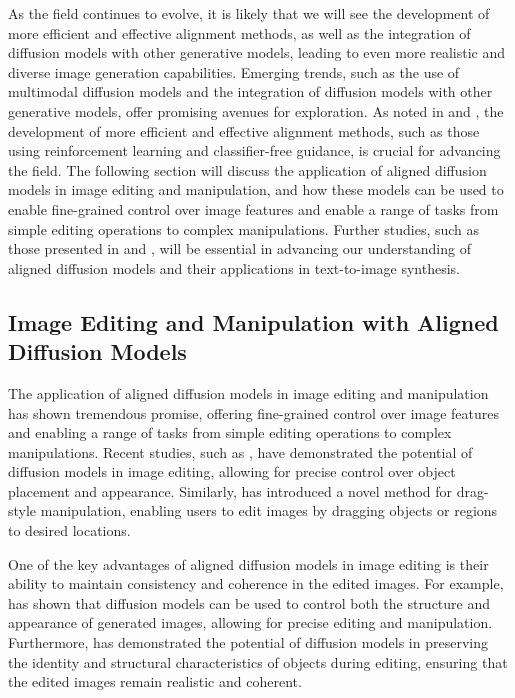 \documentclass[11pt,a4paper]{article}
\begin{document}
As the field continues to evolve, it is likely that we will see the development of more efficient and effective alignment methods, as well as the integration of diffusion models with other generative models, leading to even more realistic and diverse image generation capabilities. Emerging trends, such as the use of multimodal diffusion models and the integration of diffusion models with other generative models, offer promising avenues for exploration. As noted in \cite{doi:10.1111/cgf.15063} and \cite{doi:10.1109/tpami.2025.3545047}, the development of more efficient and effective alignment methods, such as those using reinforcement learning and classifier-free guidance, is crucial for advancing the field. The following section will discuss the application of aligned diffusion models in image editing and manipulation, and how these models can be used to enable fine-grained control over image features and enable a range of tasks from simple editing operations to complex manipulations. Further studies, such as those presented in \cite{arxiv:2410.02543} and \cite{arxiv:2510.10854}, will be essential in advancing our understanding of aligned diffusion models and their applications in text-to-image synthesis.


\subsection{Image Editing and Manipulation with Aligned Diffusion Models}


The application of aligned diffusion models in image editing and manipulation has shown tremendous promise, offering fine-grained control over image features and enabling a range of tasks from simple editing operations to complex manipulations. Recent studies, such as \cite{doi:10.1109/iccv51070.2023.00685}, have demonstrated the potential of diffusion models in image editing, allowing for precise control over object placement and appearance. Similarly, \cite{arxiv:2307.02421} has introduced a novel method for drag-style manipulation, enabling users to edit images by dragging objects or regions to desired locations.

One of the key advantages of aligned diffusion models in image editing is their ability to maintain consistency and coherence in the edited images. For example, \cite{arxiv:2406.07540} has shown that diffusion models can be used to control both the structure and appearance of generated images, allowing for precise editing and manipulation. Furthermore, \cite{arxiv:2407.10592} has demonstrated the potential of diffusion models in preserving the identity and structural characteristics of objects during editing, ensuring that the edited images remain realistic and coherent.
\end{document}
